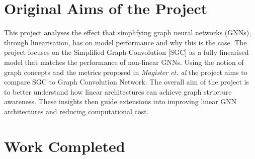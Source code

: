 \documentclass[12pt,a4paper,twoside,openright]{report}
\begin{document}

\section*{Original Aims of the Project}

This project analyses the effect that simplifying graph neural networks (GNNs), through linearisation, has on model performance and why this is the case.
The project focuses
on the Simplified Graph Convolution \cite{wu2019simplifying}[SGC] as a fully linearised model that matches the performance of non-linear GNNs.
Using the notion of graph concepts and the metrics proposed in \textit{Magister et. al} \cite{magister2021gcexplainer} the project aims to compare SGC to Graph Convolution Network.
The overall aim of the project is to better understand how linear architectures can achieve graph structure awareness.
These insights then guide extensions into improving linear GNN architectures and reducing computational cost.

\section*{Work Completed}
\end{document}
